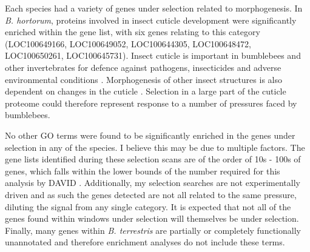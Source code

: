\documentclass[12pt]{article}
\begin{document}
\begin{linenumbers}
		Each species had a variety of genes under selection related to morphogenesis. 
    	In \emph{B. hortorum}, proteins involved in insect cuticle development were significantly enriched within the gene list, with six genes relating to this category (LOC100649166, LOC100649052, LOC100644305, LOC100648472, LOC100650261, LOC100645731). 
    	Insect cuticle is important in bumblebees and other invertebrates for defence against pathogens, insecticides and adverse environmental conditions \citep{liao_34-dihydroxyphenylacetaldehyde_2018, jackson_local_2020}. Morphogenesis of other insect structures is also dependent on changes in the cuticle \citep{kucharski_novel_2007, sun_genus-wide_2021}. Selection in a large part of the cuticle proteome could therefore represent response to a number of pressures faced by bumblebees. 
    	
    	
    	No other GO terms were found to be significantly enriched in the genes under selection in any of the species. I believe this may be due to multiple factors. The gene lists identified during these selection scans are of the order of 10s - 100s of genes, which falls within the lower bounds of the number required for this analysis by DAVID \citep{huang_systematic_2009}.
    	Additionally, my selection searches are not experimentally driven and as such the genes detected are not all related to the same pressure,
    	diluting the signal from any single category. It is expected that not all of the genes found within windows under selection will themselves be under selection. 
    	Finally, many genes within \emph{B. terrestris} are partially or completely functionally unannotated and therefore enrichment analyses do not include these terms. 
    	

\end{linenumbers}
\end{document}
